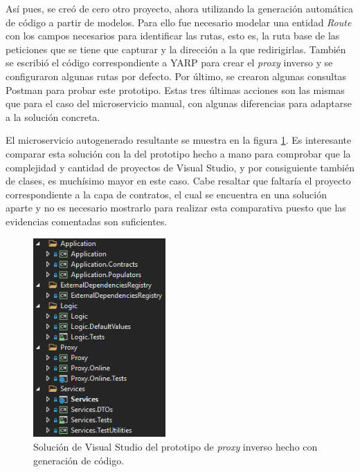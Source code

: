 \documentclass[11pt,spanish,listoffigures]{tfgetsinf}
\begin{document}
Así pues, se creó de cero otro proyecto, ahora utilizando la generación automática de código a partir de modelos. Para ello fue necesario modelar una entidad \emph{Route} con los campos necesarios para identificar las rutas, esto es, la ruta base de las peticiones que se tiene que capturar y la dirección a la que redirigirlas. También se escribió el código correspondiente a YARP para crear el \emph{proxy} inverso y se configuraron algunas rutas por defecto. Por último, se crearon algunas consultas Postman para probar este prototipo. Estas tres últimas acciones son las mismas que para el caso del microservicio manual, con algunas diferencias para adaptarse a la solución concreta.

El microservicio autogenerado resultante se muestra en la figura \ref{prototipoAutogenerado}. Es interesante comparar esta solución con la del prototipo hecho a mano para comprobar que la complejidad y cantidad de proyectos de Visual Studio, y por consiguiente también de clases, es muchísimo mayor en este caso. Cabe resaltar que faltaría el proyecto correspondiente a la capa de contratos, el cual se encuentra en una solución aparte y no es necesario mostrarlo para realizar esta comparativa puesto que las evidencias comentadas son suficientes.

\begin{figure}[ht]
\centering
\includegraphics[width=0.45\textwidth]{imagenes/prototipoAutogenerado}
\caption{Solución de Visual Studio del prototipo de \emph{proxy} inverso hecho con generación de código.}
	\label{prototipoAutogenerado}
\end{figure}

\end{document}
